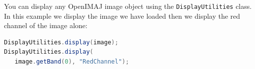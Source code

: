 You can display any OpenIMAJ image object using the \verb+DisplayUtilities+ class. In this example we display
the image we have loaded then we display the red channel of the image alone: 
\begin{lstlisting}[language=java]
DisplayUtilities.display(image);
DisplayUtilities.display(
   image.getBand(0), "RedChannel");
\end{lstlisting}

